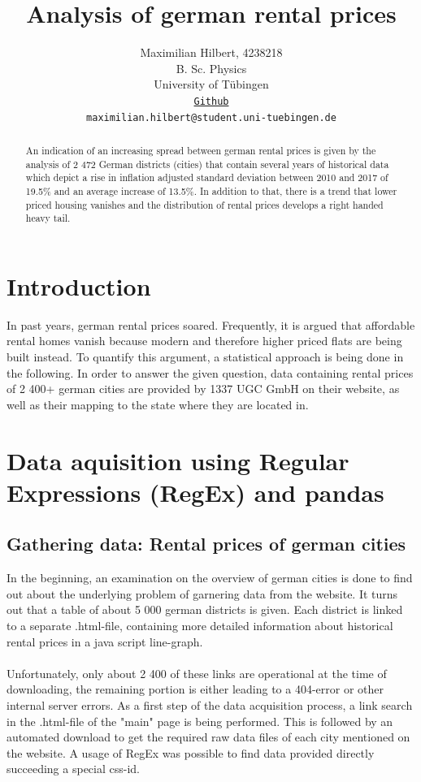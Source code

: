 \documentclass{article}
\title{Analysis of german rental prices}
\author{%
  Maximilian Hilbert, 4238218\\
  B. Sc. Physics\\
  University of Tübingen\\
  \texttt{\href{https://github.com/MaximilianHilbert/Data\_Literacy\_Project.git}{Github}}\\
  \texttt{maximilian.hilbert@student.uni-tuebingen.de}
}
\begin{document}
	\maketitle
\begin{abstract}
		An indication of an increasing spread between german rental prices is given by the analysis of 2 472 German districts (cities) that contain several years of historical data which depict a rise in inflation adjusted standard deviation between 2010 and 2017 of 19.5\% and an average increase of 13.5\%. In addition to that, there is a trend that lower priced housing vanishes and the distribution of rental prices develops a right handed heavy tail.
\end{abstract}

\section{Introduction}
	In past years, german rental prices soared. Frequently, it is argued that affordable rental homes vanish because modern and therefore higher priced flats are being built instead. To quantify this argument, a statistical approach is being done in the following. In order to answer the given question, data containing rental prices of 2 400+ german cities are provided by 1337 UGC GmbH on their website, as well as their mapping to the state where they are located in. \cite{rental_prices_city,rental_prices_states}
	
\section{Data aquisition using Regular Expressions (RegEx) and pandas}
\subsection{Gathering data: Rental prices of german cities}

	In the beginning, an examination on the overview of german cities \cite{rental_prices_city} is done to find out about the underlying problem of garnering data from the website. It turns out that a table of about 5 000 german districts is given. Each district is linked to a separate .html-file, containing more detailed information about historical rental prices in a java script line-graph. \\
	\\Unfortunately, only about 2 400 of these links are operational at the time of downloading, the remaining portion is either leading to a 404-error or other internal server errors. As a first step of the data acquisition process, a link search in the .html-file of the "main" page is being performed. This is followed by an automated download to get the required raw data files of each city mentioned on the website. A usage of RegEx was possible to find data provided directly succeeding a special css-id.
\end{document}
